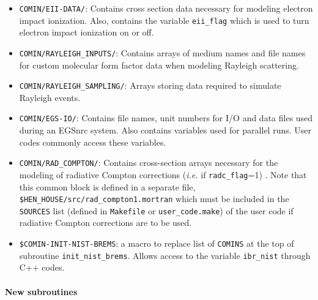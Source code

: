 \begin{itemize}
\item
{\tt COMIN/EII-DATA/}: Contains cross section 
data necessary for modeling electron
impact ionization.  Also, contains the variable {\tt eii\_flag} which
is used to turn electron impact ionization on or off.

\item
{\tt COMIN/RAYLEIGH\_INPUTS/}: Contains arrays of medium names and
file names for custom molecular form factor data when modeling
Rayleigh scattering.

\item
{\tt COMIN/RAYLEIGH\_SAMPLING/}: Arrays storing data required to
simulate Rayleigh events.

\item
{\tt COMIN/EGS-IO/}: Contains file names, unit numbers for I/O and
data files used during an EGSnrc system.  Also contains variables used
for parallel runs.  User codes commonly access these variables.

\item 
{\tt COMIN/RAD\_COMPTON/}: Contains cross-section arrays necessary for
the modeling of radiative Compton corrections
({\em i.e.} if {\tt radc\_flag}=1) .  Note that this common
block is defined in a separate file, {\tt \$HEN\_HOUSE/src/rad\_compton1.mortran} which must be included in the {\tt SOURCES} list 
(defined in {\tt Makefile} or {\tt user\_code.make}) of the user code if
radiative Compton corrections are to be used. 

\item
{\tt \$COMIN-INIT-NIST-BREMS}: a macro to replace list of {\tt COMINS}
at the top of subroutine {\tt init\_nist\_brems}.  Allows access to
the variable {\tt ibr\_nist} through C++ codes.

\end{itemize}

\paragraph{New subroutines}

